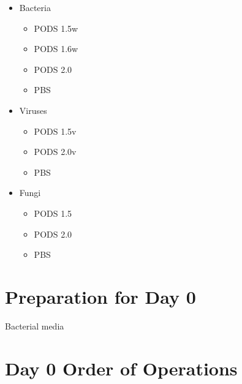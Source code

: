 \documentclass{article}
\begin{document}
\begin{itemize}
    \item Bacteria
        \begin{itemize}
            \item PODS 1.5w
            \item PODS 1.6w
            \item PODS 2.0
            \item PBS
        \end{itemize}
    \item Viruses
        \begin{itemize}
            \item PODS 1.5v
            \item PODS 2.0v
            \item PBS
        \end{itemize}
    \item Fungi
        \begin{itemize}
            \item PODS 1.5
            \item PODS 2.0
            \item PBS
        \end{itemize}
\end{itemize}


\newpage
\section{Preparation for Day 0}\label{sec:day0-prep}
Bacterial media


\section{Day 0 Order of Operations} \label{day0instructions}
\end{document}
